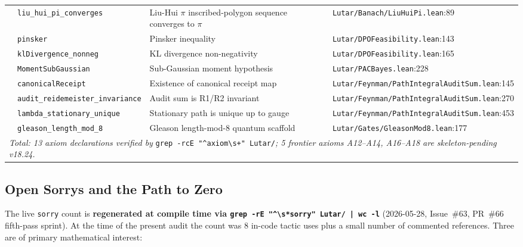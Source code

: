\begin{table}[h!]
\begin{tabular}{llp{3.5cm}p{3.5cm}}
 & \texttt{liu\_hui\_pi\_converges} & Liu-Hui $\pi$ inscribed-polygon sequence converges to $\pi$ & \texttt{Lutar/Banach/LiuHuiPi.lean}:89 \\
 & \texttt{pinsker} & Pinsker inequality & \texttt{Lutar/DPOFeasibility.lean}:143 \\
 & \texttt{klDivergence\_nonneg} & KL divergence non-negativity & \texttt{Lutar/DPOFeasibility.lean}:165 \\
 & \texttt{MomentSubGaussian} & Sub-Gaussian moment hypothesis~\cite{Vershynin2018} & \texttt{Lutar/PACBayes.lean}:228 \\
 & \texttt{canonicalReceipt} & Existence of canonical receipt map & \texttt{Lutar/Feynman/PathIntegralAuditSum.lean}:145 \\
 & \texttt{audit\_reidemeister\_invariance} & Audit sum is R1/R2 invariant & \texttt{Lutar/Feynman/PathIntegralAuditSum.lean}:270 \\
 & \texttt{lambda\_stationary\_unique} & Stationary path is unique up to gauge & \texttt{Lutar/Feynman/PathIntegralAuditSum.lean}:453 \\
 & \texttt{gleason\_length\_mod\_8} & Gleason length-mod-8 quantum scaffold~\cite{Gleason1957} & \texttt{Lutar/Gates/GleasonMod8.lean}:177 \\
\hline
\multicolumn{4}{l}{\textit{Total: 13 axiom declarations verified by} \texttt{grep -rcE "\^{}axiom\textbackslash s+" Lutar/}\textit{; 5 frontier axioms A12--A14, A16--A18 are skeleton-pending v18.24.}} \\
\end{tabular}
\end{table}

\subsection{Open Sorrys and the Path to Zero}
\label{subsec:open-sorrys}

The live \texttt{sorry} count is \textbf{regenerated at compile time via
\texttt{grep -rE "\^{}\textbackslash s*sorry" Lutar/ | wc -l}}
(2026-05-28, Issue~\#63, PR~\#66 fifth-pass sprint).
At the time of the present audit the count was 8 in-code tactic uses
plus a small number of commented references.
Three are of primary mathematical interest:

